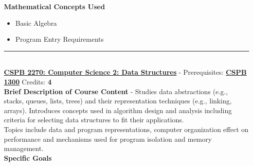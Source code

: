 \documentclass{article}
\newcommand{\horizontalline}{\noindent \rule{\textwidth}{0.5pt} \\}
\begin{document}
\noindent \textbf{Mathematical Concepts Used}
\begin{itemize}
    \item Basic Algebra
    \item Program Entry Requirements
\end{itemize}
\horizontalline
\noindent \href{https://www.colorado.edu/program/cspb/cspb-2270-computer-science-2-data-structures}{\textbf{CSPB 2270: Computer Science 2: Data Structures}} - Prerequisites: \href{https://www.colorado.edu/program/cspb/cspb-1300-computer-science-1-starting-computing}{\textbf{CSPB 1300}} Credits: \textbf{4} \\

\noindent \textbf{Brief Description of Course Content} - Studies data abstractions (e.g., stacks, queues, lists, trees) and their representation techniques (e.g., linking, arrays). Introduces concepts used in algorithm design and analysis including criteria for selecting data structures to fit their applications. \\

\noindent Topics include data and program representations, computer organization effect on performance and mechanisms used for program isolation and memory management. \\

\noindent \textbf{Specific Goals} \\
\end{document}
